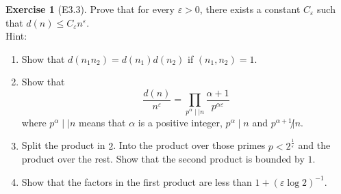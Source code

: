 \documentclass[reqno]{amsart}
\theoremstyle{definition}
\newtheorem{exercise}[theorem]{Exercise}
\theoremstyle{remark}
\begin{document}
\begin{exercise}[E3.3]
    Prove that for every $\varepsilon > 0$, there
    exists a constant $C_{\varepsilon}$ such that
    $d(n) \le C_{\varepsilon} n^{\varepsilon}$.\\
    Hint:
    \begin{enumerate}
        \item Show that $d(n_1n_2) = d(n_1)d(n_2)$ if
            $\left( n_1,n_2 \right) =1$.
        \item Show that
            \[
            \frac{d(n)}{n^{\varepsilon}}
            = \prod_{p^{\alpha} \mid  \mid   n} \frac{\alpha+1}{
            p^{\alpha \varepsilon}}
            \] 
            where $p^{\alpha} \mid  \mid n$ means that
            $\alpha$ is a positive integer,
            $p^{\alpha} \mid n$ and
            $p^{\alpha+1}\not| n$.
        \item Split the product in $2$. Into the product
            over those primes $p < 2^{\frac{1}{\varepsilon}}$ and
            the product over the rest. Show that the
            second product is bounded by $1$.
        \item Show that the factors in the first product
            are less than $1 + \left( \varepsilon \log 2 \right)^{-1}$.
    \end{enumerate}
\end{exercise}
\end{document}
